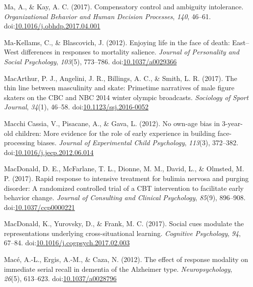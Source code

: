 \documentclass[english,man]{apa6}
\theoremstyle{definition}
\theoremstyle{definition}
\theoremstyle{definition}
\theoremstyle{remark}
\begin{document}
\hypertarget{ref-Ma2017}{}
Ma, A., \& Kay, A. C. (2017). Compensatory control and ambiguity
intolerance. \emph{Organizational Behavior and Human Decision
Processes}, \emph{140}, 46--61.
doi:\href{https://doi.org/10.1016/j.obhdp.2017.04.001}{10.1016/j.obhdp.2017.04.001}

\hypertarget{ref-Ma-Kellams2012}{}
Ma-Kellams, C., \& Blascovich, J. (2012). Enjoying life in the face of
death: East--West differences in responses to mortality salience.
\emph{Journal of Personality and Social Psychology}, \emph{103}(5),
773--786. doi:\href{https://doi.org/10.1037/a0029366}{10.1037/a0029366}

\hypertarget{ref-Macarthur2017}{}
MacArthur, P. J., Angelini, J. R., Billings, A. C., \& Smith, L. R.
(2017). The thin line between masculinity and skate: Primetime
narratives of male figure skaters on the CBC and NBC 2014 winter olympic
broadcasts. \emph{Sociology of Sport Journal}, \emph{34}(1), 46--58.
doi:\href{https://doi.org/10.1123/ssj.2016-0052}{10.1123/ssj.2016-0052}

\hypertarget{ref-MacchiCassia2012}{}
Macchi Cassia, V., Pisacane, A., \& Gava, L. (2012). No own-age bias in
3-year-old children: More evidence for the role of early experience in
building face-processing biases. \emph{Journal of Experimental Child
Psychology}, \emph{113}(3), 372--382.
doi:\href{https://doi.org/10.1016/j.jecp.2012.06.014}{10.1016/j.jecp.2012.06.014}

\hypertarget{ref-MacDonald2017a}{}
MacDonald, D. E., McFarlane, T. L., Dionne, M. M., David, L., \&
Olmsted, M. P. (2017). Rapid response to intensive treatment for bulimia
nervosa and purging disorder: A randomized controlled trial of a CBT
intervention to facilitate early behavior change. \emph{Journal of
Consulting and Clinical Psychology}, \emph{85}(9), 896--908.
doi:\href{https://doi.org/10.1037/ccp0000221}{10.1037/ccp0000221}

\hypertarget{ref-MacDonald2017}{}
MacDonald, K., Yurovsky, D., \& Frank, M. C. (2017). Social cues
modulate the representations underlying cross-situational learning.
\emph{Cognitive Psychology}, \emph{94}, 67--84.
doi:\href{https://doi.org/10.1016/j.cogpsych.2017.02.003}{10.1016/j.cogpsych.2017.02.003}

\hypertarget{ref-Mace2012}{}
Macé, A.-L., Ergis, A.-M., \& Caza, N. (2012). The effect of response
modality on immediate serial recall in dementia of the Alzheimer type.
\emph{Neuropsychology}, \emph{26}(5), 613--623.
doi:\href{https://doi.org/10.1037/a0028796}{10.1037/a0028796}
\end{document}
